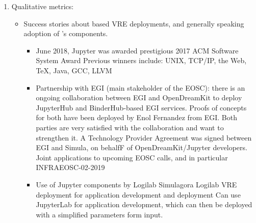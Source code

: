 \begin{enumerate}
\item Qualitative metrics:
\begin{itemize}
\item Success stories about \ODK based VRE deployments, and generally speaking adoption of \ODK's components.
\begin{itemize}
\item June 2018, Jupyter was awarded prestigious 2017 ACM Software System Award
Previous winners include: UNIX, TCP/IP, the Web, TeX, Java, GCC, LLVM

\item Partnership with EGI (main stakeholder of the EOSC): there is an ongoing collaboration between EGI and OpenDreamKit to deploy
JupyterHub and BinderHub-based EGI services. Proofs of concepts for both have been deployed by Enol Fernandez from EGI. Both parties
are very satisfied with the collaboration and want to strengthen it. A Technology Provider Agreement was signed between EGI and
Simula, on behalfF of OpenDreamKit/Jupyter developers. Joint applications to upcoming EOSC calls, and in particular INFRAEOSC-02-2019
  
\item Use of Jupyter components by Logilab
Simulagora
Logilab VRE deployment for application development and deployment
Can use JupyterLab for application development, which can then be deployed with a simplified parameters form input. %





\end{itemize}
\end{itemize}
\end{enumerate}
